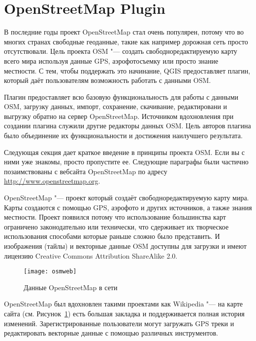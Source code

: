 
\section{OpenStreetMap Plugin}\label{plugins_osm}


В последние годы проект OpenStreetMap стал очень популярен, потому что
во многих странах свободные геоданные, такие как например дорожная сеть
просто отсутствовали. Цель проекта OSM "--- создать свободноредактируемую
карту всего мира используя данные GPS, аэрофотосъемку или просто знание
местности. С тем, чтобы поддержать это начинание, QGIS предоставляет
плагин, который даёт пользователям возможность работать с данными OSM.

Плагин предоставляет всю базовую функциональность для работы с данными
OSM, загрузку данных, импорт, сохранение, скачивание, редактировани и
выгрузку обратно на сервер OpenStreetMap. Источником вдохновления при
создании плагина служили другие редакторы данных OSM. Цель авторов
плагина было объединение их функциональности и достижения наилучшего
результата.

Следующая секция дает краткое введение в принципы проекта OSM. Если вы
с ними уже знакомы, просто пропустите ее. Следующие параграфы были
частично позаимствованы с вебсайта OpenStreetMap по адресу
\url{http://www.openstreetmap.org}.


OpenStreetMap "--- проект который создаёт свободноредактируемую карту
мира. Карты создаются с помощью GPS, аэрофото и других источников, а
также знания местности. Проект появился потому что использование
большинства карт ограничено законодательно или технически, что
сдерживает их творческое использования способами которые раньше сложно
было представить. И изображения (тайлы) и векторные данные OSM доступны
для загрузки и имеют лицензию Creative Commons Attribution ShareAlike 2.0.

\begin{figure}[ht]
   \centering
   \texttt{[image: osmweb]}
   \caption{Данные OpenStreetMap в сети \nixcaption}\label{fig:osmweb}
\end{figure}

OpenStreetMap был вдохновлен такими проектами как Wikipedia "--- на карте
сайта (см. Рисунок~\ref{fig:osmweb}) есть большая закладка
 и поддерживается полная история изменений.
Зарегистрированные пользователи могут загружать GPS треки и редактировать
векторные данные с помощью различных инструментов.

